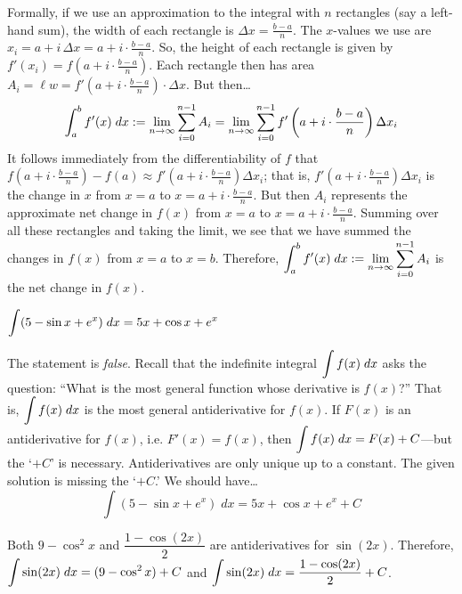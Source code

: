 \documentclass[11pt,letterpaper]{article}
\begin{document}
Formally, if we use an approximation to the integral with $n$ rectangles (say a left-hand sum), the width of each rectangle is $\Delta x= \frac{b - a}{n}$. The $x$-values we use are $x_i= a + i \,\Delta x= a + i \cdot \frac{b - a}{n}$. So, the height of each rectangle is given by $f'(x_i)= f \left( a + i \cdot \frac{b - a}{n} \right)$. Each rectangle then has area $A_i= \ell w= f' \left( a + i \cdot \frac{b - a}{n} \right) \cdot \Delta x$. But then\dots
	\[
	\displaystyle\int_a^b f'(x) \;dx:= \lim_{n \to \infty} \sum_{i=0}^{n-1} A_i= \lim_{n \to \infty} \sum_{i=0}^{n-1} f' \left( a + i \cdot \frac{b - a}{n} \right) \Delta x_i
	\]
It follows immediately from the differentiability of $f$ that $f \left( a + i \cdot \frac{b - a}{n} \right) - f(a) \approx f' \left( a + i \cdot \frac{b - a}{n} \right) \Delta x_i$; that is, $f' \left( a + i \cdot \frac{b - a}{n} \right) \Delta x_i$ is the change in $x$ from $x= a$ to $x= a + i \cdot \frac{b - a}{n}$. But then $A_i$ represents the approximate net change in $f(x)$ from $x= a$ to $x= a + i \cdot \frac{b - a}{n}$. Summing over all these rectangles and taking the limit, we see that we have summed the changes in $f(x)$ from $x= a$ to $x= b$. Therefore, $\displaystyle\int_a^b f'(x) \;dx:= \lim_{n \to \infty} \sum_{i=0}^{n-1} A_i$ is the net change in $f(x)$. \pvspace{1.3cm}



 $\displaystyle\int (5 - \sin x + e^x) \;dx= 5x + \cos x + e^x$ \pspace

\sol The statement is \textit{false}. Recall that the indefinite integral $\displaystyle\int f(x) \;dx$ asks the question: ``What is the most general function whose derivative is $f(x)$?'' That is, $\displaystyle\int f(x) \;dx$ is the most general antiderivative for $f(x)$. If $F(x)$ is an antiderivative for $f(x)$, i.e. $F'(x)= f(x)$, then $\displaystyle\int f(x) \;dx= F(x) + C$---but the `$+C$' is necessary. Antiderivatives are only unique up to a constant. The given solution is missing the `$+C$.' We should have\dots
	\[
	\int (5 - \sin x + e^x) \;dx= 5x + \cos x + e^x + C
	\] \pvspace{1.3cm}



\newpage



 Both $9 - \cos^2 x$ and $\dfrac{1 - \cos(2x)}{2}$ are antiderivatives for $\sin(2x)$. Therefore, $\displaystyle\int \sin(2x) \;dx= (9 - \cos^2 x) + C$ and $\displaystyle\int \sin(2x) \;dx= \dfrac{1 - \cos(2x)}{2} + C$. \pspace
\end{document}
